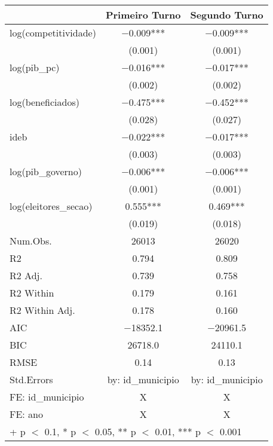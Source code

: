 \begin{table}
\centering
\begin{tabular}[t]{lcc}
\toprule
  & Primeiro Turno & Segundo Turno\\
\midrule
log(competitividade) & \num{-0.009}*** & \num{-0.009}***\\
 & (\num{0.001}) & \vphantom{1} (\num{0.001})\\
log(pib\_pc) & \num{-0.016}*** & \num{-0.017}***\\
 & (\num{0.002}) & (\num{0.002})\\
log(beneficiados) & \num{-0.475}*** & \num{-0.452}***\\
 & (\num{0.028}) & (\num{0.027})\\
ideb & \num{-0.022}*** & \num{-0.017}***\\
 & (\num{0.003}) & (\num{0.003})\\
log(pib\_governo) & \num{-0.006}*** & \num{-0.006}***\\
 & (\num{0.001}) & (\num{0.001})\\
log(eleitores\_secao) & \num{0.555}*** & \num{0.469}***\\
 & (\num{0.019}) & (\num{0.018})\\
\midrule
Num.Obs. & \num{26013} & \num{26020}\\
R2 & \num{0.794} & \num{0.809}\\
R2 Adj. & \num{0.739} & \num{0.758}\\
R2 Within & \num{0.179} & \num{0.161}\\
R2 Within Adj. & \num{0.178} & \num{0.160}\\
AIC & \num{-18352.1} & \num{-20961.5}\\
BIC & \num{26718.0} & \num{24110.1}\\
RMSE & \num{0.14} & \num{0.13}\\
Std.Errors & by: id\_municipio & by: id\_municipio\\
FE: id_municipio & X & X\\
FE: ano & X & X\\
\bottomrule
\multicolumn{3}{l}{\rule{0pt}{1em}+ p $<$ 0.1, * p $<$ 0.05, ** p $<$ 0.01, *** p $<$ 0.001}\\
\end{tabular}
\end{table}
